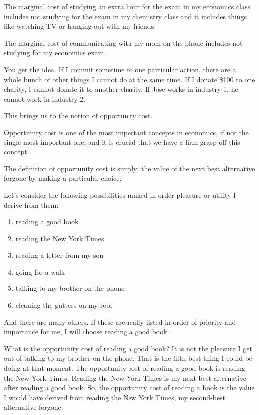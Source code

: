 \documentclass[
]{book}
\providecommand{\tightlist}{%
  \setlength{\itemsep}{0pt}\setlength{\parskip}{0pt}}
\begin{document}
The marginal cost of studying an extra hour for the exam in my economics class includes not studying for the exam in my chemistry class and it includes things like watching TV or hanging out with my friends.

The marginal cost of communicating with my mom on the phone includes not studying for my economics exam.

You get the idea. If I commit sometime to one particular action, there are a whole bunch of other things I cannot do at the same time. If I donate \$100 to one charity, I cannot donate it to another charity. If Jose works in industry 1, he cannot work in industry 2.

This brings us to the notion of opportunity cost.

Opportunity cost is one of the most important concepts in economics, if not the single most important one, and it is crucial that we have a firm grasp off this concept.

The definition of opportunity cost is simply: the value of the next best alternative forgone by making a particular choice.

Let's consider the following possibilities ranked in order pleasure or utility I derive from them:

\begin{enumerate}
\def\labelenumi{\arabic{enumi}.}
\tightlist
\item
  reading a good book
\item
  reading the New York Times
\item
  reading a letter from my son
\item
  going for a walk
\item
  talking to my brother on the phone
\item
  cleaning the gutters on my roof
\end{enumerate}

And there are many others. If these are really listed in order of priority and importance for me, I will choose reading a good book.

What is the opportunity cost of reading a good book? It is not the pleasure I get out of talking to my brother on the phone. That is the fifth best thing I could be doing at that moment. The opportunity cost of reading a good book is reading the New York Times. Reading the New York Times is my next best alternative after reading a good book. So, the opportunity cost of reading a book is the value I would have derived from reading the New York Times, my second-best alternative forgone.
\end{document}
